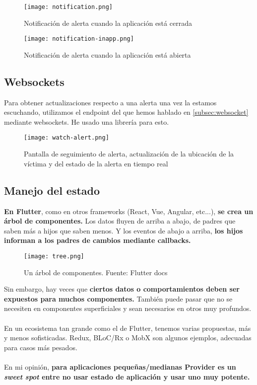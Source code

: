 \begin{figure}[H]
	\centering	
	\texttt{[image: notification.png]}
	\caption{Notificación de alerta cuando la aplicación está cerrada}
	\end{figure}

\begin{figure}[H]
	\centering	
	\texttt{[image: notification-inapp.png]}
	\caption{Notificación de alerta cuando la aplicación está abierta}
	\end{figure}

\subsection{Websockets}

Para obtener actualizaciones respecto a una alerta una vez la estamos escuchando, utilizamos el endpoint del que hemos hablado en \ref{subsec:websocket} mediante websockets.
He usado una librería \cite{websocketchannel} para esto.

\begin{figure}[H]
	\centering	
	\texttt{[image: watch-alert.png]}
	\caption{Pantalla de seguimiento de alerta, actualización de la ubicación de la víctima y del estado de la alerta en tiempo real}
	\end{figure}

\subsection{Manejo del estado}
\textbf{En Flutter}, como en otros frameworks (React, Vue, Angular, etc...), \textbf{se crea un árbol de componentes.}
Los datos fluyen de arriba a abajo, de padres que saben más a hijos que saben
menos. Y los eventos de abajo a arriba, \textbf{los hijos informan a los padres de cambios mediante callbacks.}
\begin{figure}[H]
	\centering	
	\texttt{[image: tree.png]}
	\caption{Un árbol de componentes. Fuente: Flutter docs \cite{state}}
	\end{figure}
Sin embargo, hay veces que \textbf{ciertos datos o comportamientos deben ser
expuestos para muchos componentes.} También puede pasar que no se necesiten
en componentes superficiales y sean necesarios en otros muy profundos. \\ \\
En un ecosistema tan grande como el de Flutter, tenemos varias propuestas, más y
menos sofisticadas. Redux, BLoC/Rx o MobX son algunos ejemplos, adecuadas
para casos más pesados.\\ \\
En mi opinión, \textbf{para aplicaciones pequeñas/medianas Provider es un \textit{sweet spot}
entre no usar estado de aplicación y usar uno muy potente.} \\ \\


